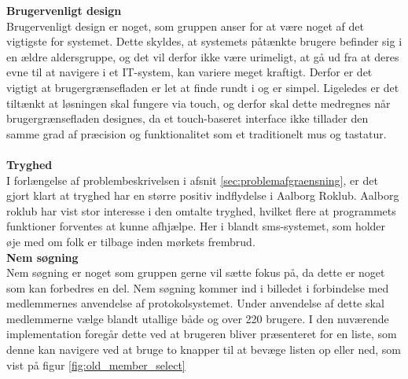 \textbf{Brugervenligt design}\\
Brugervenligt design er noget, som gruppen anser for at være noget af det vigtigste for systemet. Dette skyldes, at systemets påtænkte brugere befinder sig i en ældre aldersgruppe, og det vil derfor ikke være urimeligt, at gå ud fra at deres evne til at navigere i et IT-system, kan variere meget kraftigt. Derfor er det vigtigt at brugergrænsefladen er let at finde rundt i og er simpel.
Ligeledes er det tiltænkt at løsningen skal fungere via touch, og derfor skal dette medregnes når brugergrænsefladen designes, da et touch-baseret interface ikke tillader den samme grad af præcision og funktionalitet som et traditionelt mus og tastatur.\\\\

\textbf{Tryghed}\\

I forlængelse af problembeskrivelsen i afsnit \ref{sec:problemafgraensning}, er det gjort klart at tryghed har en større positiv indflydelse i Aalborg Roklub. Aalborg roklub har vist stor interesse i den omtalte tryghed, hvilket flere at programmets funktioner forventes at kunne afhjælpe. Her i blandt sms-systemet, som holder øje med om folk er tilbage inden mørkets frembrud.\\

\textbf{Nem søgning}\\
Nem søgning er noget som gruppen gerne vil sætte fokus på, da dette er noget som kan forbedres en del. Nem søgning kommer ind i billedet i forbindelse med medlemmernes anvendelse af protokolsystemet. Under anvendelse af dette skal medlemmerne vælge blandt utallige både og over 220 brugere. I den nuværende implementation foregår dette ved at brugeren bliver præsenteret for en liste, som denne kan navigere ved at bruge to knapper til at bevæge listen op eller ned, som vist på figur \ref{fig:old_member_select}


